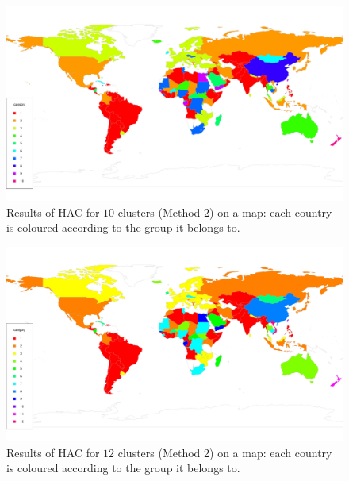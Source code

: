 \documentclass[a4paper,12pt]{article}
\numberwithin{equation}{section}
\begin{document}
\newpage 
\FloatBarrier
\begin{figure}[t!]
\begin{minipage}[t]{0.98\textwidth}
\includegraphics[width=\textwidth]{plots/14days/map_alt_10cl}
\caption{Results of HAC for $10$ clusters (Method 2) on a map: each country is coloured according to the group it belongs to.}\label{fig:map_alt_10cl}
\end{minipage}
\end{figure}

\begin{figure}[t!]
\begin{minipage}[t]{0.98\textwidth}
\includegraphics[width=\textwidth]{plots/14days/map_alt_12cl}
\caption{Results of HAC for $12$ clusters (Method 2) on a map: each country is coloured according to the group it belongs to.}
\end{minipage}
\end{figure}
\end{document}
